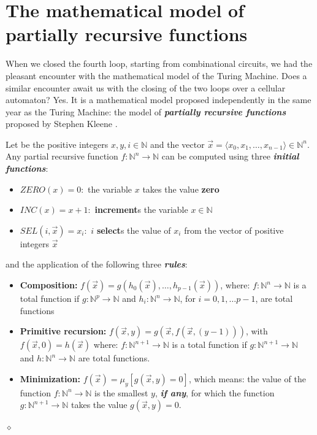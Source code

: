 \section{The mathematical model of partially recursive functions}

When we closed the fourth loop, starting from combinational circuits, we had the pleasant encounter with the mathematical model of the Turing Machine. Does a similar encounter await us with the closing of the two loops over a cellular automaton? Yes. It is a mathematical model proposed independently in the same year as the Turing Machine: the model of {\bf {\em partially recursive functions}} proposed by Stephen Kleene \cite{Kleene36}.

\begin{definition}\label{parrec}
Let be the positive integers $x,y,i \in \mathbb{N}$ and the vector $\vec{x} = \langle x_0, x_1, \ldots, x_{n-1} \rangle \in \mathbb{N}^n$. Any partial recursive function $f: \mathbb{N}^n \rightarrow \mathbb{N}$ can be computed using three {\bf {\em initial functions}}:
\begin{itemize}
\item $ZERO(x) = 0:$ the variable $x$ takes the value {\bf zero}
\item $INC(x) = x+1:$ {\bf increment}s the variable $x \in \mathbb{N}$
\item $SEL(i, \vec{x}) = x_i:$ $i$ {\bf select}s the value of $x_i$ from the vector of positive integers $\vec{x}$
\end{itemize}
and the application of the following three {\bf {\em rules}}:
\begin{itemize}
\item {\bf Composition:}  $f(\vec{x}) = g(h_0(\vec{x}), \ldots, h_{p-1}(\vec{x}))$,
    where:  $f: \mathbb{N}^n \rightarrow \mathbb{N}$ is a total function if  $g: \mathbb{N}^p \rightarrow \mathbb{N}$ and  $h_i: \mathbb{N}^n \rightarrow \mathbb{N}$, for $i = 0,1, \ldots p-1$, are total functions
\item {\bf Primitive recursion:} $f(\vec{x},y) = g(\vec{x}, f(\vec{x}, (y-1)))$,  with $f(\vec{x},0) = h(\vec{x})$
    where:  $f:  \mathbb{N}^{n+1} \rightarrow  \mathbb{N}$ is a total function if $g:  \mathbb{N}^{n+1} \rightarrow  \mathbb{N}$ and $h:  \mathbb{N}^n \rightarrow  \mathbb{N}$ are total functions.
\item {\bf Minimization:} $f(\vec{x}) = \mu_y[g(\vec{x},y) = 0]$,
    which means: the value of the function  $f:  \mathbb{N}^{n} \rightarrow  \mathbb{N}$ is the smallest $y$, {\bf {\em if any}}, for which the function $g:  \mathbb{N}^{n+1} \rightarrow  \mathbb{N}$ takes the value $g(\vec{x},y) = 0$.
\end{itemize}

$\diamond$
\end{definition}


